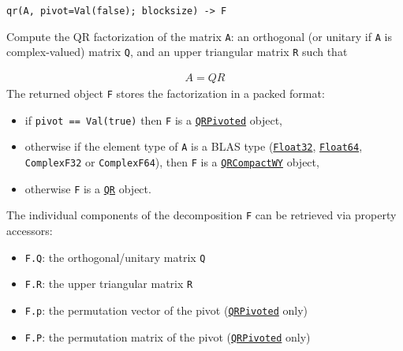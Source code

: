 \begin{adjustwidth}{2em}{0pt}


\begin{verbatim}
qr(A, pivot=Val(false); blocksize) -> F
\end{verbatim}

Compute the QR factorization of the matrix \texttt{A}: an orthogonal (or unitary if \texttt{A} is complex-valued) matrix \texttt{Q}, and an upper triangular matrix \texttt{R} such that

\begin{equation*}
\begin{split}A = Q R\end{split}\end{equation*}
The returned object \texttt{F} stores the factorization in a packed format:

\begin{itemize}
\item if \texttt{pivot == Val(true)} then \texttt{F} is a \hyperlink{1950169381798525185}{\texttt{QRPivoted}} object,


\item otherwise if the element type of \texttt{A} is a BLAS type (\hyperlink{8101639384272933082}{\texttt{Float32}}, \hyperlink{5027751419500983000}{\texttt{Float64}}, \texttt{ComplexF32} or \texttt{ComplexF64}), then \texttt{F} is a \hyperlink{15814215390089782499}{\texttt{QRCompactWY}} object,


\item otherwise \texttt{F} is a \hyperlink{16913872014958777367}{\texttt{QR}} object.

\end{itemize}
The individual components of the decomposition \texttt{F} can be retrieved via property accessors:

\begin{itemize}
\item \texttt{F.Q}: the orthogonal/unitary matrix \texttt{Q}


\item \texttt{F.R}: the upper triangular matrix \texttt{R}


\item \texttt{F.p}: the permutation vector of the pivot (\hyperlink{1950169381798525185}{\texttt{QRPivoted}} only)


\item \texttt{F.P}: the permutation matrix of the pivot (\hyperlink{1950169381798525185}{\texttt{QRPivoted}} only)


\end{itemize}
\end{adjustwidth}

